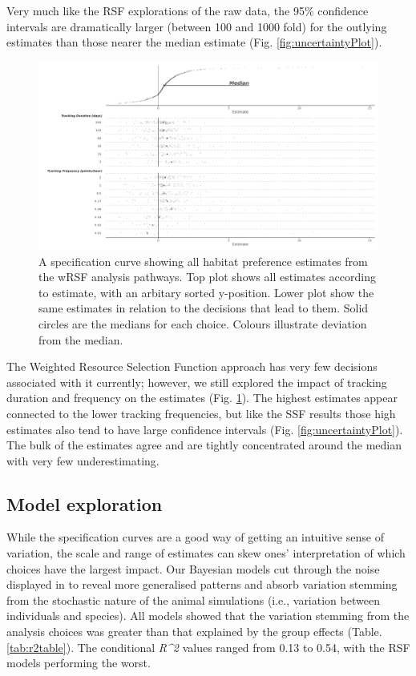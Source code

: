 \documentclass[10pt,a4paper]{article}
\begin{document}
Very much like the RSF explorations of the raw data, the 95\% confidence intervals are dramatically larger (between 100 and 1000 fold) for the outlying estimates than those nearer the median estimate (Fig. \ref{fig:uncertaintyPlot}).

\begin{figure}
\includegraphics[width=1\linewidth]{../figures/wrsfSpecCurve} \caption{A specification curve showing all habitat preference estimates from the wRSF analysis pathways. Top plot shows all estimates according to estimate, with an arbitary sorted y-position. Lower plot show the same estimates in relation to the decisions that lead to them. Solid circles are the medians for each choice. Colours illustrate deviation from the median.}\label{fig:specCurveWRSF}
\end{figure}

The Weighted Resource Selection Function approach has very few decisions associated with it currently; however, we still explored the impact of tracking duration and frequency on the estimates (Fig. \ref{fig:specCurveWRSF}).
The highest estimates appear connected to the lower tracking frequencies, but like the SSF results those high estimates also tend to have large confidence intervals (Fig. \ref{fig:uncertaintyPlot}).
The bulk of the estimates agree and are tightly concentrated around the median with very few underestimating.

\hypertarget{model-exploration}{%
\subsection{Model exploration}\label{model-exploration}}

While the specification curves are a good way of getting an intuitive sense of variation, the scale and range of estimates can skew ones' interpretation of which choices have the largest impact.
Our Bayesian models cut through the noise displayed in to reveal more generalised patterns and absorb variation stemming from the stochastic nature of the animal simulations (i.e., variation between individuals and species).
All models showed that the variation stemming from the analysis choices was greater than that explained by the group effects (Table. \ref{tab:r2table}).
The conditional \emph{R\^{}2} values ranged from 0.13 to 0.54, with the RSF models performing the worst.
\end{document}
